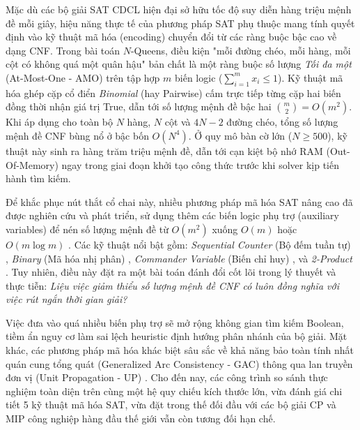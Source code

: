 \documentclass[a4paper,fleqn]{cas-sc}
\begin{document}
Mặc dù các bộ giải SAT CDCL hiện đại sở hữu tốc độ suy diễn hàng triệu mệnh đề mỗi giây, hiệu năng thực tế của phương pháp SAT phụ thuộc mang tính quyết định vào kỹ thuật mã hóa (encoding) chuyển đổi từ các ràng buộc bậc cao về dạng CNF. Trong bài toán $N$-Queens, điều kiện "mỗi đường chéo, mỗi hàng, mỗi cột có không quá một quân hậu" bản chất là một ràng buộc số lượng \textit{Tối đa một} (At-Most-One - AMO) trên tập hợp $m$ biến logic ($\sum_{i=1}^m x_i \le 1$). Kỹ thuật mã hóa ghép cặp cổ điển \textit{Binomial} (hay Pairwise) cấm trực tiếp từng cặp hai biến đồng thời nhận giá trị True, dẫn tới số lượng mệnh đề bậc hai $\binom{m}{2} = O(m^2)$. Khi áp dụng cho toàn bộ $N$ hàng, $N$ cột và $4N - 2$ đường chéo, tổng số lượng mệnh đề CNF bùng nổ ở bậc bốn $O(N^4)$. Ở quy mô bàn cờ lớn ($N \ge 500$), kỹ thuật này sinh ra hàng trăm triệu mệnh đề, dẫn tới cạn kiệt bộ nhớ RAM (Out-Of-Memory) ngay trong giai đoạn khởi tạo công thức trước khi solver kịp tiến hành tìm kiếm.

Để khắc phục nút thắt cổ chai này, nhiều phương pháp mã hóa SAT nâng cao đã được nghiên cứu và phát triển, sử dụng thêm các biến logic phụ trợ (auxiliary variables) để nén số lượng mệnh đề từ $O(m^2)$ xuống $O(m)$ hoặc $O(m \log m)$ \cite{sinz2005towards,klieber2007commander,chen2010new,frisch2005atmost}. Các kỹ thuật nổi bật gồm: \textit{Sequential Counter} (Bộ đếm tuần tự) \cite{sinz2005towards}, \textit{Binary} (Mã hóa nhị phân) \cite{frisch2005atmost}, \textit{Commander Variable} (Biến chỉ huy) \cite{klieber2007commander}, và \textit{2-Product} \cite{chen2010new}. Tuy nhiên, điều này đặt ra một bài toán đánh đổi cốt lõi trong lý thuyết và thực tiễn: \textit{Liệu việc giảm thiểu số lượng mệnh đề CNF có luôn đồng nghĩa với việc rút ngắn thời gian giải?}

Việc đưa vào quá nhiều biến phụ trợ sẽ mở rộng không gian tìm kiếm Boolean, tiềm ẩn nguy cơ làm sai lệch heuristic định hướng phân nhánh của bộ giải. Mặt khác, các phương pháp mã hóa khác biệt sâu sắc về khả năng bảo toàn tính nhất quán cung tổng quát (Generalized Arc Consistency - GAC) thông qua lan truyền đơn vị (Unit Propagation - UP) \cite{gent2002arc}. Cho đến nay, các công trình so sánh thực nghiệm toàn diện trên cùng một hệ quy chiếu kích thước lớn, vừa đánh giá chi tiết 5 kỹ thuật mã hóa SAT, vừa đặt trong thế đối đầu với các bộ giải CP và MIP công nghiệp hàng đầu thế giới vẫn còn tương đối hạn chế.
\end{document}
